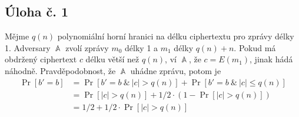 \documentclass{scrartcl}
\DeclareMathOperator{\Prob}{\text{Pr}}
\DeclareMathOperator{\A}{\mathbb{A}}
\begin{document}
    \subsection*{Úloha č. 1}
    Mějme $q(n)$ polynomiální horní hranici na délku ciphertextu pro zprávy délky 1. Adversary $\A$ zvolí zprávy $m_0$ délky 1 a $m_1$ délky $q(n) + n$. Pokud má obdržený ciphertext $c$ délku větší než $q(n)$, ví $\A$, že $c = E(m_1)$, jinak hádá náhodně. Pravděpodobnost, že $\A$ uhádne zprávu, potom je
    \begin{align*}
        \Prob[b' = b] &= \Prob[b' = b\ \&\ |c| > q(n)] + \Prob[b' = b\ \&\ |c| \leq q(n)] \\
        &= \Prob[|c| > q(n)] + 1/2 \cdot (1 - \Prob[|c| > q(n)]) \\
        &= 1/2 + 1/2 \cdot \Prob[|c| > q(n)]
    \end{align*}
\end{document}

